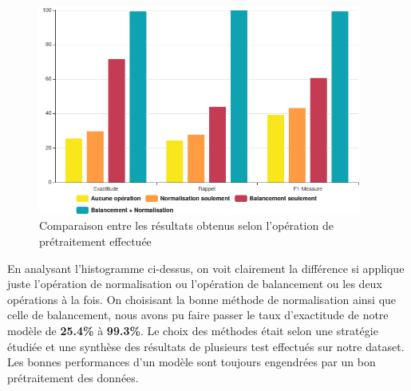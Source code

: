 \begin{figure}[h]
\centering
\includegraphics[width=0.95\textwidth]{Figures/performances}
\decoRule
\caption{Comparaison entre les résultats obtenus selon l'opération de prétraitement effectuée}
\label{fig:histogramme}
\end{figure} 
\newpage
En analysant l'histogramme ci-dessus, on voit clairement la différence si applique juste l'opération de normalisation ou l'opération de balancement ou les deux opérations à la fois. On choisisant la bonne méthode de normalisation ainsi 
que celle de balancement, nous avons pu faire passer le taux d'exactitude de notre modèle de \textbf{25.4\%} à \textbf{99.3\%}. Le choix des méthodes était selon une stratégie étudiée et  une synthèse des résultats de plusieurs test effectués sur notre dataset. Les bonnes performances d'un modèle sont toujours engendrées par un bon prétraitement des données.

\newpage
